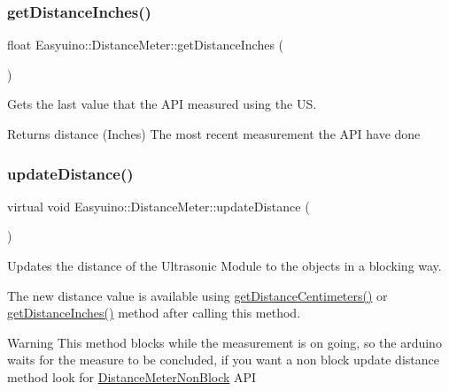 \subsubsection{\texorpdfstring{get\+Distance\+Inches()}{getDistanceInches()}}
{\footnotesize\ttfamily float Easyuino\+::\+Distance\+Meter\+::get\+Distance\+Inches (\begin{DoxyParamCaption}{ }\end{DoxyParamCaption})}



Gets the last value that the A\+PI measured using the US. 

\begin{DoxyReturn}{Returns}
distance (Inches) The most recent measurement the A\+PI have done 
\end{DoxyReturn}
\mbox{\label{class_easyuino_1_1_distance_meter_a739197578f06b58faedefd0526d49499}} 
\subsubsection{\texorpdfstring{update\+Distance()}{updateDistance()}}
{\footnotesize\ttfamily virtual void Easyuino\+::\+Distance\+Meter\+::update\+Distance (\begin{DoxyParamCaption}{ }\end{DoxyParamCaption})\hspace{0.3cm}{\ttfamily [virtual]}}



Updates the distance of the Ultrasonic Module to the objects in a blocking way. 

The new distance value is available using \hyperlink{class_easyuino_1_1_distance_meter_a637cdd0d3e4f3bcf094704ae91e0c7c3}{get\+Distance\+Centimeters()} or \hyperlink{class_easyuino_1_1_distance_meter_a4e3c650c54382d9af6bca51dcac4e7a3}{get\+Distance\+Inches()} method after calling this method. \begin{DoxyWarning}{Warning}
This method blocks while the measurement is on going, so the arduino waits for the measure to be concluded, if you want a non block update distance method look for \hyperlink{class_easyuino_1_1_distance_meter_non_block}{Distance\+Meter\+Non\+Block} A\+PI 
\end{DoxyWarning}


